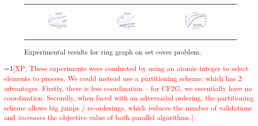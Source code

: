 \documentclass{article} %
\newcommand{\Comments}{1}
\newcommand{\note}[2]{\ifnum\Comments=1\textcolor{#1}{#2}\fi}
\newcommand{\xinghao}[1]{\note{red}{[XP: #1]}}
\begin{document}
\begin{figure}[ht]
  \centering
  \begin{tabular}{cccc}
	  \begin{subfigure}[h]{0.32\textwidth}
	  	\includegraphics[width=150pt]{images/runtime_ring_setcover.png}
			\caption{}
			\label{fig:runtime_ring_setcover}
	  \end{subfigure} &
	  \begin{subfigure}[h]{0.32\textwidth}
	  	\includegraphics[width=150pt]{images/speedup_ring_setcover.png}
			\caption{}
			\label{fig:speedup_ring_setcover}
	  \end{subfigure} &
	  \begin{subfigure}[h]{0.32\textwidth}
	  	\includegraphics[width=150pt]{images/validateddiffFA_ring_setcover.png}
			\caption{}
			\label{fig:validateddiffFA_ring_setcover}
	  \end{subfigure} \\
  \end{tabular}
  \caption{\footnotesize Experimental results for ring graph on set cover problem.}
\label{fig:results_adversarial}
\end{figure}

\xinghao{These experiments were conducted by using an atomic integer to select elements to process. We could instead use a partitioning scheme, which has 2 advantages. Firstly, there is less coordination -- for CF2G, we essentially have no coordination.
Secondly, when faced with an adversarial ordering, the partitioning scheme allows big jumps / re-orderings, which reduces the number of validations and \textit{increases} the objective value of both parallel algorithms.}
\end{document}
